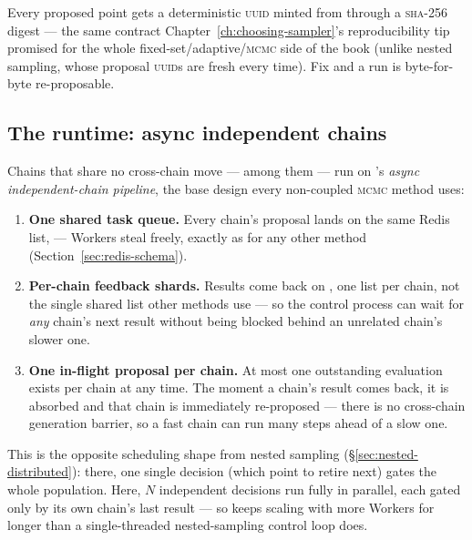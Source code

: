 Every proposed point gets a deterministic \textsc{uuid} minted from
 through a \textsc{sha}-256 digest ---
the same contract Chapter~\ref{ch:choosing-sampler}'s reproducibility tip promised for
the whole fixed-set/adaptive/\textsc{mcmc} side of the book (unlike nested sampling,
whose proposal \textsc{uuid}s are fresh every time). Fix  and a
 run is byte-for-byte re-proposable.

\subsection{The runtime: async independent chains}
\label{sec:mcmc-runtime}

Chains that share no cross-chain move ---  among them --- run on
\Jtwo's \emph{async independent-chain pipeline}, the base design every non-coupled
\textsc{mcmc} method uses:

\begin{enumerate}
  \item \textbf{One shared task queue.} Every chain's proposal lands on the same
        Redis list,  --- Workers steal freely, exactly as for
        any other method (Section~\ref{sec:redis-schema}).
  \item \textbf{Per-chain feedback shards.} Results come back on
        , one list per chain, not the single shared
         list other methods use --- so the control process can
        wait for \emph{any} chain's next result without being blocked behind an
        unrelated chain's slower one.
  \item \textbf{One in-flight proposal per chain.} At most one outstanding evaluation
        exists per chain at any time. The moment a chain's result comes back, it is
        absorbed and that chain is immediately re-proposed --- there is no
        cross-chain generation barrier, so a fast chain can run many steps ahead of a
        slow one.
\end{enumerate}

\begin{jnote}
This is the opposite scheduling shape from nested sampling
(\S\ref{sec:nested-distributed}): there, one single decision (which point to retire
next) gates the whole population. Here, $N$ independent decisions run fully in
parallel, each gated only by its own chain's last result --- so
 keeps scaling with more Workers for longer than a single-threaded
nested-sampling control loop does.
\end{jnote}

